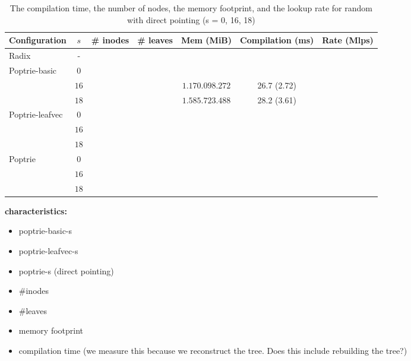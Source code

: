 \documentclass{article}
\begin{document}
\begin{table}
    \begin{center}
        \begin{tabular}{|l|c|c|c|c|c|c|}
            \hline
            Configuration   & $s$ & \# inodes & \# leaves & Mem (MiB) & Compilation (ms) & Rate (Mlps) \\ 
            \hline
            Radix           & -   & &  & & & \\ 
            \hline                           
            Poptrie-basic   & $0$ & & &  & & \\  
                            & $16$ & & & $1.170.098.272$ & 26.7 (2.72) & \\  
                            & $18$ & & & $1.585.723.488$ & 28.2 (3.61) & \\  
            \hline                           
            Poptrie-leafvec & $0$ & & & & & \\
                            & $16$ & & & & & \\
                            & $18$ & & & & & \\
            \hline
            Poptrie         & $0$  & & & & & \\
                            & $16$ & & & & & \\
                            & $18$ & & & & & \\
            \hline
        \end{tabular}
    \end{center}
    \caption{The compilation time, the number of nodes, the memory footprint, and the lookup rate for
random with direct pointing (s = 0, 16, 18)}
\end{table}
\noindent
\textbf{characteristics:}
\begin{itemize}
    \item poptrie-basic-s
    \item poptrie-leafvec-s
    \item poptrie-s (direct pointing)
    \item \#inodes
    \item \#leaves
    \item memory footprint
    \item compilation time (we measure this because
    we reconstruct the tree. Does this include rebuilding the tree?)
\end{itemize}
\end{document}
